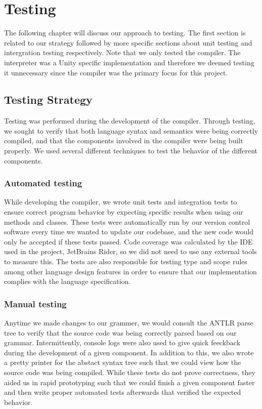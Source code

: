 \chapter{Testing}

The following chapter will discuss our approach to testing.
The first section is related to our strategy followed by more specific sections about unit testing and intergration testing respectively.
Note that we only tested the \dazel{} compiler. 
The interpreter was a Unity specific implementation and therefore we deemed testing it unnecessary since the compiler was the primary focus for this project.

\section{Testing Strategy}
Testing was performed during the development of the \dazel{} compiler. 
Through testing, we sought to verify that both language syntax and semantics were being correctly compiled, and that the components involved in the compiler were being built properly.
We used several different techniques to test the behavior of the different components. 

\subsection*{Automated testing}
While developing the compiler, we wrote unit tests and integration tests to ensure correct program behavior by expecting specific results when using our methods and classes. 
These tests were automatically run by our version control software every time we wanted to update our codebase, and the new code would only be accepted if these tests passed.
Code coverage was calculated by the IDE used in the project, JetBrains Rider, so we did not need to use any external tools to measure this\cite{rider_test_coverage}.
The tests are also responsible for testing type and scope rules among other language design features in order to ensure that our implementation complies with the language specification.

\subsection*{Manual testing}
Anytime we made changes to our grammer, we would consult the ANTLR parse tree to verify that the source code was being correctly parsed based on our grammar. 
Intermittently, console logs were also used to give quick feeckback during the development of a given component.
In addition to this, we also wrote a pretty printer for the abstact syntax tree such that we could view how the source code was being compiled.
While these tests do not prove correctness, they aided us in rapid prototyping such that we could finish a given component faster and then write proper automated tests afterwards that verified the expected behavior.  


